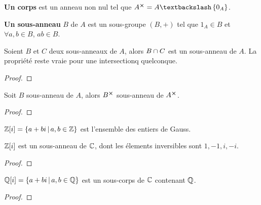 \begin{definition}
	\textbf{Un corps} est un anneau non nul tel que $A^{\cartprod} = A
	\textbackslash \GSset{0_{A}}$.
\end{definition}

\begin{definition}
	\textbf{Un sous-anneau} $B$ de $A$ est un sous-groupe $(B, +)$ tel que
	$1_{A} \in B$ et $\forall a, b \in B$, $ab \in B$.
\end{definition}


\begin{proposition}
	Soient $B$ et $C$ deux sous-anneaux de $A$, alors $B \cap C$ est un
	sous-anneau de $A$. La propriété reste vraie pour une intersectionq
	quelconque.
\end{proposition}

\ifdefined\outputproof
\begin{proof}

\end{proof}
\fi

\begin{proposition}
	Soit $B$ sous-anneau de $A$, alors $B^{\cross}$ sous-anneau de
	$A^{\cross}$.
\end{proposition}

\ifdefined\outputproof
\begin{proof}

\end{proof}
\fi

\begin{definition}
	$\mathbb{Z}[i] = \left\{a + bi \, | \, a, b \in \mathbb{Z} \right\}$ est l'ensemble des
	entiers de Gauss.
\end{definition}

\begin{proposition}
	$\mathbb{Z}[i]$ est un sous-anneau de $\mathbb{C}$, dont les élements
	inversibles sont $1, -1, i, -i$.
\end{proposition}

\ifdefined\outputproof
\begin{proof}

\end{proof}
\fi

\begin{proposition}
	$\mathbb{Q}[i] = \left\{a + bi \, | \, a, b \in \mathbb{Q} \right\}$ est un sous-corps de
	$\mathbb{C}$ contenant $\mathbb{Q}$.
\end{proposition}

\ifdefined\outputproof
\begin{proof}

\end{proof}
\fi

